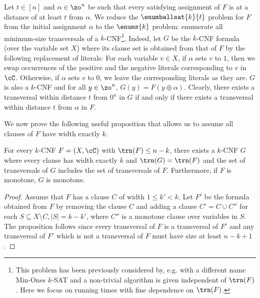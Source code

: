 Let $t\in [n]$ and $\alpha\in \zo^n$ be such 
that every satisfying assignment of $F$ is at a distance
of at least $t$ from $\alpha$. 
We reduce the $\enumballsat{k}{t}$  problem for $F$
from the initial assignment $\alpha$
to the $\enumz{k}$  problem:
enumerate all 
minimum-size transversals of a $k$-CNF\footnote{This problem has been previously considered by, e.g. \cite{FominGLS19} with a different name {\sc Min-Ones $k$-SAT} and a non-trivial algorithm is given independent of $\trn(F)$. Here we focus on running times with fine dependence on $\trn(F)$.}.
Indeed, let $G$ be the $k$-CNF formula (over 
the variable set $X$) where its
clause set is obtained from that of
$F$ by the following replacement of literals:  
For each variable $v\in X$, if $\alpha$ sets $v$ to $1$, 
then we swap occurrences of the positive and the negative 
literals corresponding to $v$ in $\cC$. 
Otherwise, if $\alpha$ sets $v$ to $0$,  we leave the corresponding literals
as they are.
$G$ is also a $k$-CNF and 
for all $y\in \zo^n$, $G(y) = F(y\oplus \alpha)$. Clearly, 
there exists a transversal within distance $t$ 
from $0^n$ in $G$ if and only if there exists a transversal 
within distance $t$ from $\alpha$ in $F$. 

We now prove the following useful proposition that
allows us to assume all clauses of $F$ have width exactly $k$.

\begin{proposition}
\label{prop:monotone-k-cnf-uniform}
For every $k$-CNF $F = (X, \cC)$ with $\trn(F) \le n-k$,
there exists a $k$-CNF $G$ where every clause has width exactly $k$
and $\trn(G) = \trn(F)$
and the set of transversals of $G$ includes the
set of transversals of $F$.
Furthermore, if $F$ is monotone, $G$ is monotone.
\end{proposition}

\begin{proof}
Assume that $F$ has a clause $C$ of width $1\leq k'<k$.
Let $F'$ be the formula obtained from $F$ by removing the clause $C$
and adding a clause  $C' = C\cup C'' $ for
each $S\subseteq X\setminus C, |S|= k-k'$, where $C''$ is a monotone clause over variables in $S$.
The proposition follows since every transversal of
$F$ is a transversal of $F'$ and any transversal
of $F'$ which is not a transversal of $F$ must have size at least $n-k+1$.
\end{proof}

